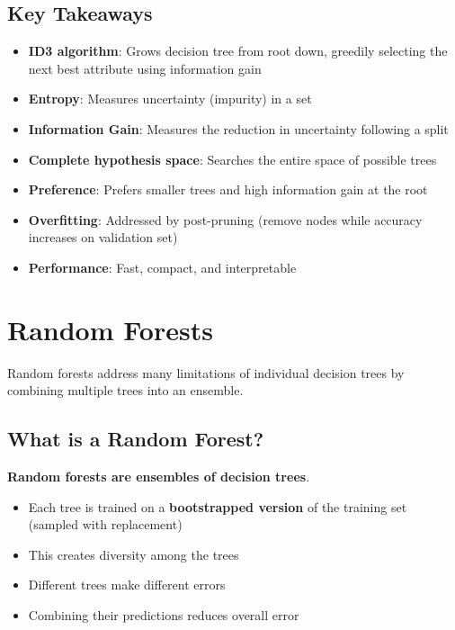 \documentclass[a4paper]{article}
\theoremstyle{definition}
\begin{document}
\subsection{Key Takeaways}
\begin{itemize}
    \item \textbf{ID3 algorithm}: Grows decision tree from root down, greedily selecting the next best attribute using information gain 
    \item \textbf{Entropy}: Measures uncertainty (impurity) in a set 
    \item \textbf{Information Gain}: Measures the reduction in uncertainty following a split 
    \item \textbf{Complete hypothesis space}: Searches the entire space of possible trees 
    \item \textbf{Preference}: Prefers smaller trees and high information gain at the root 
    \item \textbf{Overfitting}: Addressed by post-pruning (remove nodes while accuracy increases on validation set)
    \item \textbf{Performance}: Fast, compact, and interpretable
\end{itemize}
\section{Random Forests}
Random forests address many limitations of individual decision trees by combining multiple trees into an ensemble.
\subsection{What is a Random Forest?}
\textbf{Random forests are ensembles of decision trees}.
\begin{itemize}
    \item Each tree is trained on a \textbf{bootstrapped version} of the training set (sampled with replacement)
    \item This creates diversity among the trees 
    \item Different trees make different errors 
    \item Combining their predictions reduces overall error
\end{itemize}
\end{document}

